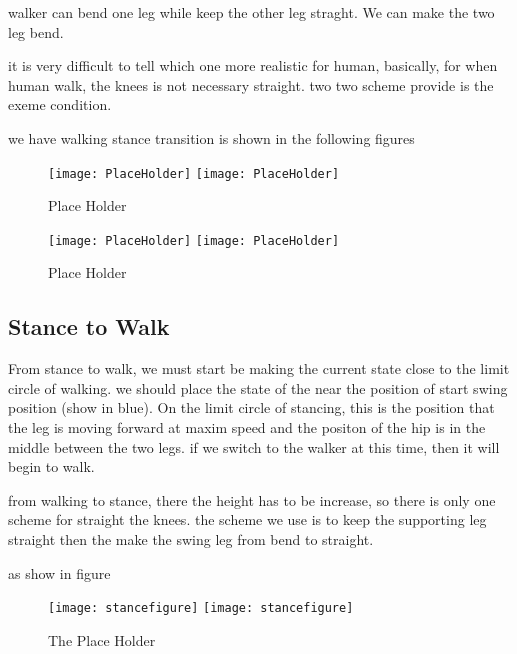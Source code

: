 \begin{itemize}
		walker can bend one leg while keep the other leg straght.
		We can make the two leg bend.
\end{itemize}

it is very difficult to tell which one more realistic for human, basically, for when human walk, the knees is not necessary straight.
two two scheme provide is the exeme condition.

we have walking stance transition is shown in the following figures

\begin{figure}[!htbp]
  \begin{center}
    \leavevmode
    \ifpdf
      \texttt{[image: PlaceHolder]}
    \else
      \texttt{[image: PlaceHolder]}
    \fi
    \caption{Place Holder}
    \label{fig:walkstancestraight}
\end{center}
\end{figure}

\begin{figure}[!htbp]
  \begin{center}
    \leavevmode
    \ifpdf
      \texttt{[image: PlaceHolder]}
    \else
      \texttt{[image: PlaceHolder]}
    \fi
    \caption{Place Holder}
    \label{fig:walkstancebend}
\end{center}
\end{figure}

\subsection{Stance to Walk}
From stance to walk, we must start be making the current state close to the limit circle of walking.
we should place the state of the near the position of start swing position (show in blue).
On the limit circle of stancing, this is the position that the leg is moving forward at maxim speed and the positon of the hip is in the middle between the two legs.
if we switch to the walker at this time, then it will begin to walk.



from walking to stance, there the height has to be increase, so there is only one scheme for straight the knees.
the scheme we use is to keep the supporting leg straight then the make the swing leg from bend to straight.

as show in figure
\begin{figure}[!htbp]
  \begin{center}
    \leavevmode
    \ifpdf
      \texttt{[image: stancefigure]}
    \else
      \texttt{[image: stancefigure]}
    \fi
    \caption{The Place Holder}
    \label{fig:stance2walk}
\end{center}
\end{figure}


